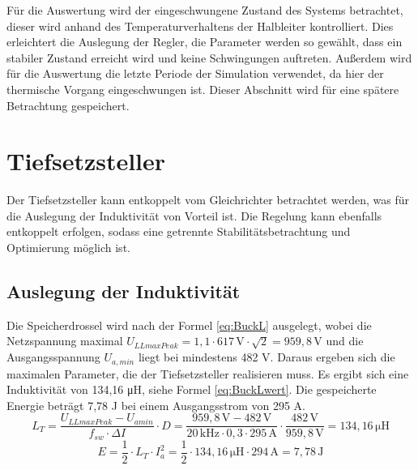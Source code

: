 Für die Auswertung wird der eingeschwungene Zustand des Systems betrachtet, dieser wird anhand des Temperaturverhaltens der Halbleiter kontrolliert. Dies erleichtert die Auslegung der Regler, die Parameter werden so gewählt, dass ein stabiler Zustand erreicht wird und keine Schwingungen auftreten. Außerdem wird für die Auswertung die letzte Periode der Simulation verwendet, da hier der thermische Vorgang eingeschwungen ist. Dieser Abschnitt wird für eine spätere Betrachtung gespeichert.

\section{Tiefsetzsteller}
Der Tiefsetzsteller kann entkoppelt vom Gleichrichter betrachtet werden, was für die Auslegung der Induktivität von Vorteil ist. Die Regelung kann ebenfalls entkoppelt erfolgen, sodass eine getrennte Stabilitätsbetrachtung und Optimierung möglich ist. 
	\subsection{Auslegung der Induktivität}
	Die Speicherdrossel wird nach der Formel \ref{eq:BuckL} ausgelegt, wobei die Netzspannung maximal $U_{LLmaxPeak}=1,1 \cdot 617\, \si{\V} \cdot \sqrt{2}=959,8\, \si{\V}$ und die Ausgangsspannung $U_{a,min}$ liegt bei mindestens 482 \si{\V}. Daraus ergeben sich die maximalen Parameter, die der Tiefsetzsteller realisieren muss. Es ergibt sich eine Induktivität von 134,16 \si{\micro \henry}, siehe Formel \ref{eq:BuckLwert}. Die gespeicherte Energie beträgt 7,78 \si{\joule} bei einem Ausgangsstrom von 295 A. 
	\begin{equation}
	\label{eq:BuckLwert}
	L_{T}= \dfrac{U_{LLmaxPeak}-U_{amin}}{f_{sw} \cdot \Delta I} \cdot D = \dfrac{959,8\,\si{\V} - 482\, \si{\V}}{20\, \si{\kilo \hertz}\cdot 0,3 \cdot 295\, \si{\ampere}} \cdot \dfrac{482\, \si{\V}}{959,8\, \si{\V}}= 134,16 \,\si{\micro \henry} 
	\end{equation}
	\begin{equation}
		E=\dfrac{1}{2} \cdot L_{T} \cdot I_{a}^{2} = \dfrac{1}{2} \cdot 134,16\, \si{\micro \henry}  \cdot 294\, \si{\ampere} = 7,78\, \si{\joule}
	\end{equation}
